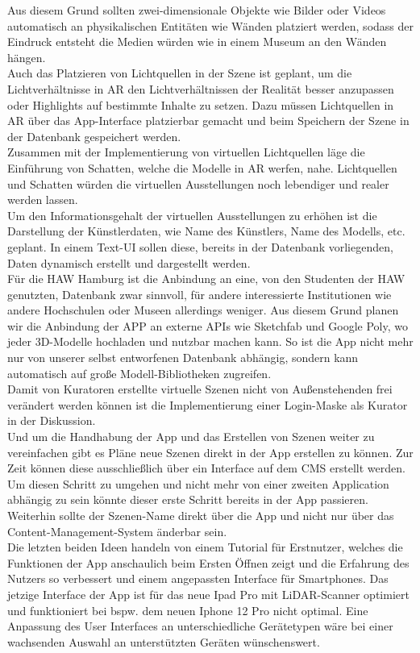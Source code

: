 \documentclass[titlepage, a4paper, 11pt]{scrartcl}
\begin{document}
        Aus diesem Grund sollten zwei-dimensionale Objekte wie Bilder oder Videos automatisch an physikalischen Entitäten wie Wänden platziert werden, sodass der Eindruck entsteht die Medien würden wie in einem Museum an den Wänden hängen.\\
        Auch das Platzieren von Lichtquellen in der Szene ist geplant, um die Lichtverhältnisse in AR den Lichtverhältnissen der Realität besser anzupassen oder Highlights auf bestimmte Inhalte zu setzen. 
        Dazu müssen Lichtquellen in AR über das App-Interface platzierbar gemacht und beim Speichern der Szene in der Datenbank gespeichert werden.\\
        Zusammen mit der Implementierung von virtuellen Lichtquellen läge die Einführung von Schatten, welche die Modelle in AR werfen, nahe. 
        Lichtquellen und Schatten würden die virtuellen Ausstellungen noch lebendiger und realer werden lassen.\\
        Um den Informationsgehalt der virtuellen Ausstellungen zu erhöhen ist die Darstellung der Künstlerdaten, wie Name des Künstlers, Name des Modells, etc. geplant. 
        In einem Text-UI sollen diese, bereits in der Datenbank vorliegenden, Daten dynamisch erstellt und dargestellt werden.\\
        Für die HAW Hamburg ist die Anbindung an eine, von den Studenten der HAW genutzten, Datenbank zwar sinnvoll, für andere interessierte Institutionen wie andere Hochschulen oder Museen allerdings weniger. 
        Aus diesem Grund planen wir die Anbindung der APP an externe APIs wie Sketchfab und Google Poly, wo jeder 3D-Modelle hochladen und nutzbar machen kann. So ist die App nicht mehr nur von unserer selbst entworfenen Datenbank abhängig, sondern kann automatisch auf große Modell-Bibliotheken zugreifen.\\
        Damit von Kuratoren erstellte virtuelle Szenen nicht von Außenstehenden frei verändert werden können ist die Implementierung einer Login-Maske als Kurator in der Diskussion.\\
        Und um die Handhabung der App und das Erstellen von Szenen weiter zu vereinfachen gibt es Pläne neue Szenen direkt in der App erstellen zu können. Zur Zeit können diese ausschließlich über ein Interface auf dem CMS erstellt werden. 
        Um diesen Schritt zu umgehen und nicht mehr von einer zweiten Application abhängig zu sein könnte dieser erste Schritt bereits in der App passieren. Weiterhin sollte der Szenen-Name direkt über die App und nicht nur über das Content-Management-System änderbar sein.\\
        Die letzten beiden Ideen handeln von einem Tutorial für Erstnutzer, welches die Funktionen der App anschaulich beim Ersten Öffnen zeigt und die Erfahrung des Nutzers so verbessert und einem angepassten Interface für Smartphones. 
        Das jetzige Interface der App ist für das neue Ipad Pro mit LiDAR-Scanner optimiert und funktioniert bei bspw. dem neuen Iphone 12 Pro nicht optimal. Eine Anpassung des User Interfaces an unterschiedliche Gerätetypen wäre bei einer wachsenden Auswahl an unterstützten Geräten wünschenswert.\\
\end{document}
